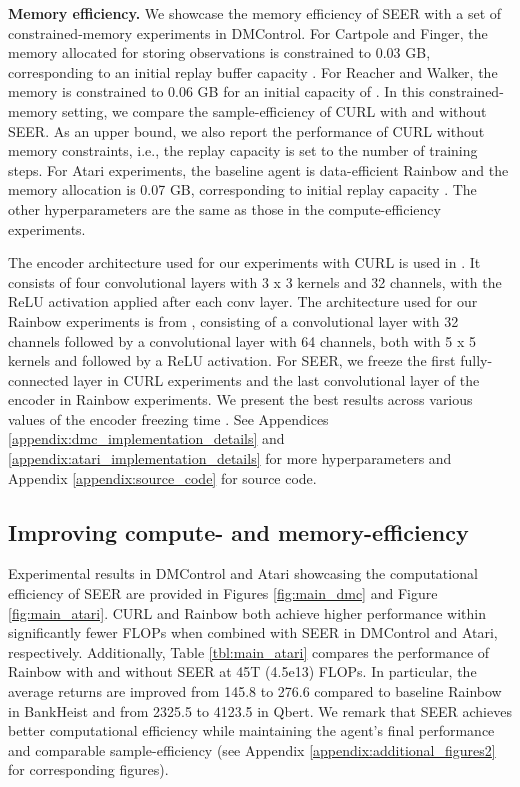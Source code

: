 \documentclass{article}
\begin{document}
\textbf{Memory efficiency.} We showcase the memory efficiency of SEER with a set of constrained-memory experiments in DMControl. For Cartpole and Finger, the memory allocated for storing observations is constrained to 0.03 GB, corresponding to an initial replay buffer capacity . For Reacher and Walker, the memory is constrained to 0.06 GB for an initial capacity of . In this constrained-memory setting, we compare the sample-efficiency of CURL with and without SEER.
As an upper bound, we also report the performance of CURL without memory constraints, i.e., the replay capacity is set to the number of training steps.
For Atari experiments,
the baseline agent is data-efficient Rainbow and the memory allocation is 0.07 GB, corresponding to initial replay capacity . 
The other hyperparameters are the same as those in the compute-efficiency experiments. 

The encoder architecture used for our experiments with CURL is used in \citet{yarats2019improving}. It consists of four convolutional layers
with 3 x 3 kernels and 32 channels, with the ReLU activation applied after each conv layer. The architecture used for our Rainbow experiments is from \citet{van2019use}, consisting of a convolutional layer with 32 channels followed by a convolutional layer with 64 channels, both with 5 x 5 kernels and followed by a ReLU activation. For SEER, we freeze the first fully-connected layer in CURL experiments and the last convolutional layer of the encoder in Rainbow experiments. We present the best results across various values of the encoder freezing time . See Appendices \ref{appendix:dmc_implementation_details} and  \ref{appendix:atari_implementation_details} for more hyperparameters and Appendix \ref{appendix:source_code} for source code.



\subsection{Improving compute- and memory-efficiency} \label{main_exps}

Experimental results in DMControl and Atari showcasing the computational efficiency of SEER are provided in Figures \ref{fig:main_dmc} and Figure \ref{fig:main_atari}. 
CURL and Rainbow both achieve higher performance within significantly fewer FLOPs when combined with SEER in DMControl and Atari, respectively.
Additionally, Table \ref{tbl:main_atari} compares the performance of Rainbow with and without SEER at 45T (4.5e13) FLOPs. In particular, the average returns are improved from 145.8 to 276.6 compared to baseline Rainbow in BankHeist and from 2325.5 to 4123.5 in Qbert. We remark that SEER achieves better computational efficiency while maintaining the agent's final performance and comparable sample-efficiency (see Appendix \ref{appendix:additional_figures2} for corresponding figures).
\end{document}

